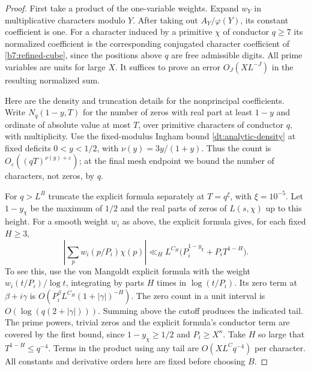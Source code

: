 \documentclass[11pt,a4paper]{article}
\theoremstyle{paperplain}
\numberwithin{equation}{section}
\begin{document}
\begin{proof}
First take a product of the one-variable weights. Expand \(w_Y\)
in multiplicative characters modulo \(Y\). After taking out
\(A_Y/\varphi(Y)\), its constant coefficient is one. For a character
induced by a primitive \(\chi\) of conductor \(q\ge7\) its normalized
coefficient is the corresponding conjugated character coefficient of \eqref{b7:refined-cube}, since the positions above \(q\)
are free admissible digits. All prime variables are units for large
\(X\). It suffices to prove an error \(O_J(XL^{-J})\) in the resulting
normalized sum.

Here are the density and truncation details for the nonprincipal
coefficients. Write \(N_q(1-y,T)\) for the number of zeros with
real part at least \(1-y\) and ordinate of absolute value at most
\(T\), over primitive characters of conductor \(q\), with multiplicity.
Use the fixed-modulus Ingham bound \eqref{dt:analytic-density} at
fixed deficits $0<y<1/2$, with $\nu(y)=3y/(1+y)$. Thus the count is
$O_\varepsilon((qT)^{\nu(y)+\varepsilon})$; at the final mesh endpoint
we bound the number of characters, not zeros, by $q$.

For \(q>L^B\) truncate the explicit formula separately at
\(T=q^{\xi}\), with \(\xi=10^{-5}\). Let \(1-y_\chi\) be the
maximum of \(1/2\) and the real parts of zeros of \(L(s,\chi)\) up
to this height. For a smooth weight \(w_i\) as above, the explicit
formula gives, for each fixed \(H\ge3\),
\[
 \left|\sum_p w_i(p/P_i)\chi(p)\right|
 \ll_H L^{C_H}\big(P_i^{1-y_\chi}+P_i T^{1-H}\big).
\]
To see this, use the von Mangoldt explicit formula with the weight
\(w_i(t/P_i)/\log t\), integrating by parts \(H\) times in
\(\log(t/P_i)\). Its zero term at \(\beta+i\gamma\) is
\(O(P_i^\beta L^{C_H}(1+|\gamma|)^{-H})\). The zero count in a
unit interval is \(O(\log(q(2+|\gamma|)))\). Summing above the
cutoff produces the indicated tail. The prime powers, trivial
zeros and the explicit formula's conductor term are covered by the
first bound, since \(1-y_\chi\ge1/2\) and \(P_i\ge X^\kappa\).
Take \(H\) so large that \(T^{1-H}\le q^{-4}\).
Terms in the product using any tail are \(O(XL^{C}q^{-4})\) per
character. All constants and derivative orders here are fixed before
choosing \(B\).


\end{proof}
\end{document}
